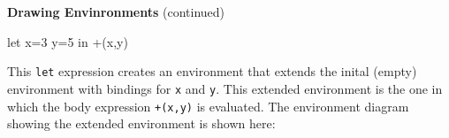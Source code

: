 \begin{minipage}[t]{\sw}
\slidenumber
\LARGE
{\bf Drawing Envinronments} (continued)
\begin{qv}
let
  x=3
  y=5
in
  +(x,y)
\end{qv}
This \verb'let' expression creates an environment
that extends the inital (empty) environment
with bindings for \verb'x' and \verb'y'.
This extended environment is the one
in which the body expression \verb'+(x,y)' is evaluated.
The environment diagram showing the extended environment
is shown here:\exx
\centerline{}
\end{minipage}
\clearpage
